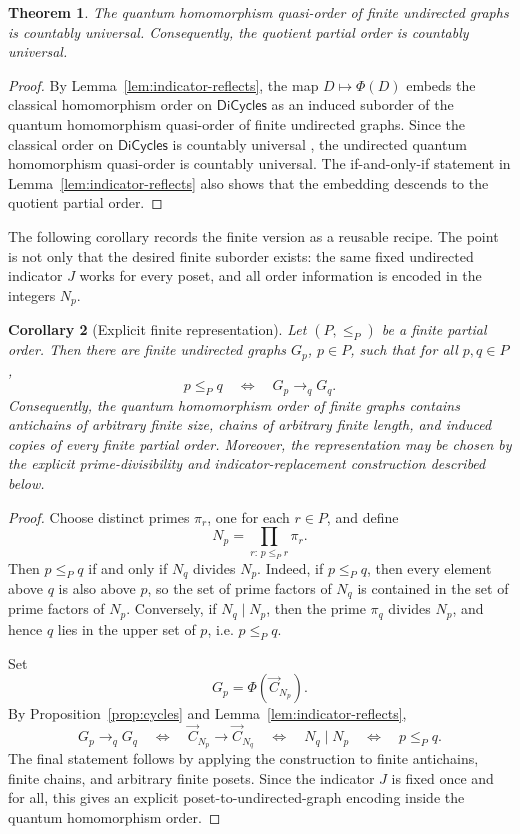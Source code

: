 \documentclass[11pt]{amsart}
\theoremstyle{plain}
\newtheorem{theorem}{Theorem}[section]
\newtheorem{corollary}[theorem]{Corollary}
\theoremstyle{definition}
\newcommand{\toq}{\to_q}
\newcommand{\Cyc}{\overrightarrow{C}}
\newcommand{\DiCycles}{\mathsf{DiCycles}}
\begin{document}
\begin{theorem}\label{thm:undirected-universal}
The quantum homomorphism quasi-order of finite undirected graphs is countably universal.  Consequently, the quotient partial order is countably universal.
\end{theorem}

\begin{proof}
By Lemma~\ref{lem:indicator-reflects}, the map $D\mapsto \Phi(D)$ embeds the classical homomorphism order on $\DiCycles$ as an induced suborder of the quantum homomorphism quasi-order of finite undirected graphs.  Since the classical order on $\DiCycles$ is countably universal \cite{FialaHubickaLong}, the undirected quantum homomorphism quasi-order is countably universal.  The if-and-only-if statement in Lemma~\ref{lem:indicator-reflects} also shows that the embedding descends to the quotient partial order.

\end{proof}

The following corollary records the finite version as a reusable recipe.  The point is not only that the desired finite suborder exists: the same fixed undirected indicator $J$ works for every poset, and all order information is encoded in the integers $N_p$.

\begin{corollary}[Explicit finite representation]\label{cor:finite-posets}
Let $(P,\le_P)$ be a finite partial order.  Then there are finite undirected graphs $G_p$, $p\in P$, such that for all $p,q\in P$,
\[
   p\le_P q
   \quad\Longleftrightarrow\quad
   G_p\toq G_q.
\]
Consequently, the quantum homomorphism order of finite graphs contains antichains of arbitrary finite size, chains of arbitrary finite length, and induced copies of every finite partial order.  Moreover, the representation may be chosen by the explicit prime-divisibility and indicator-replacement construction described below.
\end{corollary}

\begin{proof}
Choose distinct primes $\pi_r$, one for each $r\in P$, and define
\[
   N_p=\prod_{r:\,p\le_P r}\pi_r.
\]
Then $p\le_P q$ if and only if $N_q$ divides $N_p$.  Indeed, if $p\le_P q$, then every element above $q$ is also above $p$, so the set of prime factors of $N_q$ is contained in the set of prime factors of $N_p$.  Conversely, if $N_q\mid N_p$, then the prime $\pi_q$ divides $N_p$, and hence $q$ lies in the upper set of $p$, i.e. $p\le_P q$.

Set
\[
   G_p=\Phi(\Cyc_{N_p}).
\]
By Proposition~\ref{prop:cycles} and Lemma~\ref{lem:indicator-reflects},
\[
   G_p\toq G_q
   \quad\Longleftrightarrow\quad
   \Cyc_{N_p}\to \Cyc_{N_q}
   \quad\Longleftrightarrow\quad
   N_q\mid N_p
   \quad\Longleftrightarrow\quad
   p\le_P q.
\]
The final statement follows by applying the construction to finite antichains, finite chains, and arbitrary finite posets.  Since the indicator $J$ is fixed once and for all, this gives an explicit poset-to-undirected-graph encoding inside the quantum homomorphism order.
\end{proof}
\end{document}
